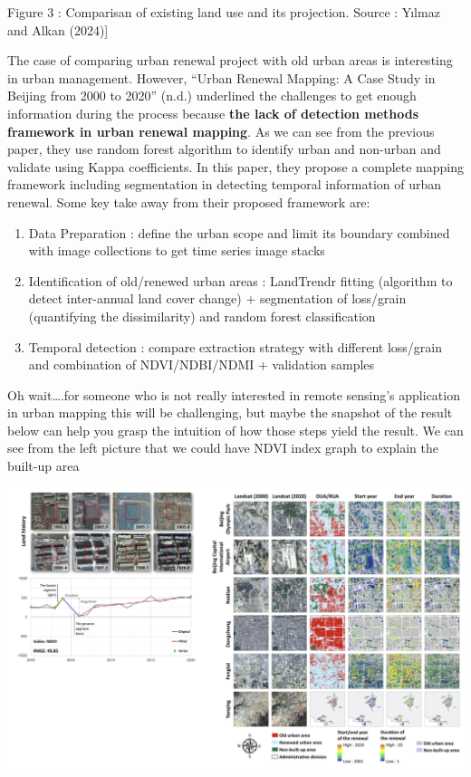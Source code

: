 \documentclass[
  letterpaper,
  DIV=11,
  numbers=noendperiod]{scrreprt}
\providecommand{\tightlist}{%
  \setlength{\itemsep}{0pt}\setlength{\parskip}{0pt}}\usepackage{longtable,booktabs,array}
\begin{document}
Figure 3 : Comparisan of existing land use and its projection. Source :
Yılmaz and Alkan (2024){]}

The case of comparing urban renewal project with old urban areas is
interesting in urban management. However, {``Urban Renewal Mapping: A
Case Study in Beijing from 2000 to 2020''} (n.d.) underlined the
challenges to get enough information during the process because
\textbf{the lack of detection methods framework in urban renewal
mapping}. As we can see from the previous paper, they use random forest
algorithm to identify urban and non-urban and validate using Kappa
coefficients. In this paper, they propose a complete mapping framework
including segmentation in detecting temporal information of urban
renewal. Some key take away from their proposed framework are:

\begin{enumerate}
\def\labelenumi{\arabic{enumi}.}
\tightlist
\item
  Data Preparation : define the urban scope and limit its boundary
  combined with image collections to get time series image stacks
\item
  Identification of old/renewed urban areas : LandTrendr fitting
  (algorithm to detect inter-annual land cover change) + segmentation of
  loss/grain (quantifying the dissimilarity) and random forest
  classification
\item
  Temporal detection : compare extraction strategy with different
  loss/grain and combination of NDVI/NDBI/NDMI + validation samples
\end{enumerate}

Oh wait\ldots.for someone who is not really interested in remote
sensing's application in urban mapping this will be challenging, but
maybe the snapshot of the result below can help you grasp the intuition
of how those steps yield the result. We can see from the left picture
that we could have NDVI index graph to explain the built-up area

\includegraphics[width=7.83333in,height=\textheight]{images/clipboard-2246403998.png}
\end{document}
